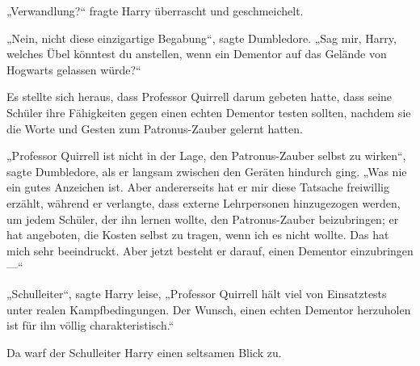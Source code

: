 „Verwandlung?“ fragte Harry überrascht und geschmeichelt.

„Nein, nicht diese einzigartige Begabung“, sagte Dumbledore.
„Sag mir, Harry, welches Übel könntest du anstellen, wenn ein Dementor auf das Gelände von Hogwarts gelassen würde?“

\later

Es stellte sich heraus, dass Professor Quirrell darum gebeten hatte, dass seine Schüler ihre Fähigkeiten gegen einen echten Dementor testen sollten, nachdem sie die Worte und Gesten zum Patronus-Zauber gelernt hatten.

„Professor Quirrell ist nicht in der Lage, den Patronus-Zauber selbst zu wirken“, sagte Dumbledore, als er langsam zwischen den Geräten hindurch ging.
„Was nie ein gutes Anzeichen ist. Aber andererseits hat er mir diese Tatsache freiwillig erzählt, während er verlangte, dass externe Lehrpersonen hinzugezogen werden, um jedem Schüler, der ihn lernen wollte, den Patronus-Zauber beizubringen; er hat angeboten, die Kosten selbst zu tragen, wenn ich es nicht wollte. Das hat mich sehr beeindruckt. Aber jetzt besteht er darauf, einen Dementor einzubringen —“

„Schulleiter“, sagte Harry leise,
„Professor Quirrell hält viel von Einsatztests unter realen Kampfbedingungen. Der Wunsch, einen echten Dementor herzuholen ist für ihn völlig charakteristisch.“

Da warf der Schulleiter Harry einen seltsamen Blick zu.

